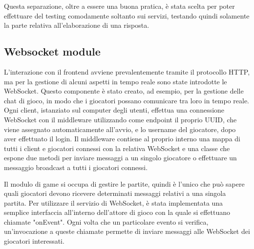 Questa separazione, oltre a essere una buona pratica, è stata scelta per poter effettuare del testing comodamente soltanto sui servizi, testando quindi solamente la parte relativa all'elaborazione di una risposta.

\subsection{Websocket module}

L'interazione con il frontend avviene prevalentemente tramite il protocollo HTTP, ma per la gestione di alcuni aspetti in tempo reale sono state introdotte le WebSocket.
Questo componente è stato creato, ad esempio, per la gestione delle chat di gioco, in modo che i giocatori possano comunicare tra loro in tempo reale. Ogni client, istanziato sul computer degli utenti, effettua una connessione WebSocket con il middleware utilizzando come endpoint il proprio UUID, che viene assegnato automaticamente all'avvio, e lo username del giocatore, dopo aver effettuato il login. Il middleware contiene al proprio interno una mappa di tutti i client e giocatori connessi con la relativa WebSocket e una classe che espone due metodi per inviare messaggi a un singolo giocatore o effettuare un messaggio broadcast a tutti i giocatori connessi.

Il modulo di game si occupa di gestire le partite, quindi è l'unico che può sapere quali giocatori devono ricevere determinati messaggi relativi a una singola partita. Per utilizzare il servizio di WebSocket, è stata implementata una semplice interfaccia all'interno dell'attore di gioco con la quale si effettuano chiamate "onEvent". Ogni volta che un particolare evento si verifica, un'invocazione a queste chiamate permette di inviare messaggi alle WebSocket dei giocatori interessati.

